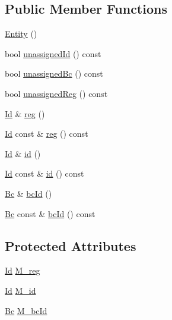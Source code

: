 \subsection*{Public Member Functions}
\begin{DoxyCompactItemize}
\item 
\hyperlink{classTspeed_1_1Entity_a2d38b43574ff32961cc54430d2641d9d}{Entity} ()
\item 
bool \hyperlink{classTspeed_1_1Entity_a0254af0831b2f3d9d2e225e8720f85b9}{unassigned\-Id} () const 
\item 
bool \hyperlink{classTspeed_1_1Entity_aea3dc95515ad3a025039de1963a33a06}{unassigned\-Bc} () const 
\item 
bool \hyperlink{classTspeed_1_1Entity_ac1505ecd50daa5fcefe3bc6366977fc4}{unassigned\-Reg} () const 
\item 
\hyperlink{classTspeed_1_1Entity_a32da920d1e9397a793b67beadd70e8fe}{Id} \& \hyperlink{classTspeed_1_1Entity_a783e9df1d967686bc39f26e43f7b6c3e}{reg} ()
\item 
\hyperlink{classTspeed_1_1Entity_a32da920d1e9397a793b67beadd70e8fe}{Id} const \& \hyperlink{classTspeed_1_1Entity_a69cb766f9523627435d0ff37e511253c}{reg} () const 
\item 
\hyperlink{classTspeed_1_1Entity_a32da920d1e9397a793b67beadd70e8fe}{Id} \& \hyperlink{classTspeed_1_1Entity_abefec95d2d2511aa8ccc508a4472a339}{id} ()
\item 
\hyperlink{classTspeed_1_1Entity_a32da920d1e9397a793b67beadd70e8fe}{Id} const \& \hyperlink{classTspeed_1_1Entity_a38b1c806bcf12dfe99a66d343aff8004}{id} () const 
\item 
\hyperlink{namespaceTspeed_a301e5218199485c06d62434c719ea5e0}{Bc} \& \hyperlink{classTspeed_1_1Entity_a986365e93ee83bb0b4706260ee1c9892}{bc\-Id} ()
\item 
\hyperlink{namespaceTspeed_a301e5218199485c06d62434c719ea5e0}{Bc} const \& \hyperlink{classTspeed_1_1Entity_aab5641d64b52564729a9f55a24b9bb1b}{bc\-Id} () const 
\end{DoxyCompactItemize}
\subsection*{Protected Attributes}
\begin{DoxyCompactItemize}
\item 
\hyperlink{classTspeed_1_1Entity_a32da920d1e9397a793b67beadd70e8fe}{Id} \hyperlink{classTspeed_1_1Entity_a4c553133417f2766bd5898d2fa558374}{M\-\_\-reg}
\item 
\hyperlink{classTspeed_1_1Entity_a32da920d1e9397a793b67beadd70e8fe}{Id} \hyperlink{classTspeed_1_1Entity_a78689c259080e251d0e4ae01db20a7ba}{M\-\_\-id}
\item 
\hyperlink{namespaceTspeed_a301e5218199485c06d62434c719ea5e0}{Bc} \hyperlink{classTspeed_1_1Entity_a768810bb9f657134eac0ba66a8e0d77b}{M\-\_\-bc\-Id}
\end{DoxyCompactItemize}


